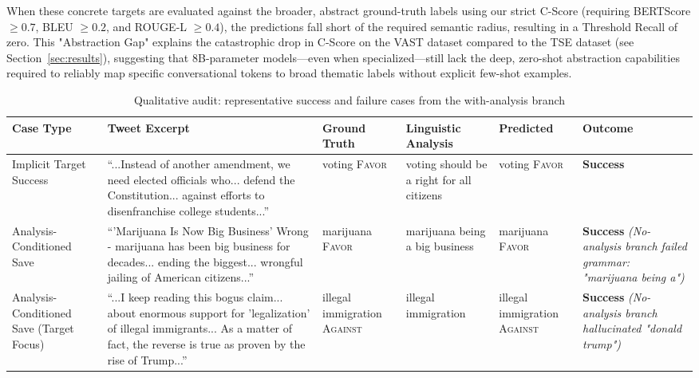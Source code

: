 \documentclass[conference]{IEEEtran}
\begin{document}
When these concrete targets are evaluated against the broader, abstract ground-truth labels using our strict C-Score (requiring BERTScore $\ge 0.7$, BLEU $\ge 0.2$, and ROUGE-L $\ge 0.4$), the predictions fall short of the required semantic radius, resulting in a Threshold Recall of zero. This "Abstraction Gap" explains the catastrophic drop in C-Score on the VAST dataset compared to the TSE dataset (see Section~\ref{sec:results}), suggesting that 8B-parameter models—even when specialized—still lack the deep, zero-shot abstraction capabilities required to reliably map specific conversational tokens to broad thematic labels without explicit few-shot examples.


\begin{table}[htbp]
\caption{Qualitative audit: representative success and failure cases from the with-analysis branch}
\label{tab:interpretability_audit}
\centering
\small
\begin{tabular}{|p{}|p{}|p{}|p{}|p{}|p{}|}
\hline
\textbf{Case Type} & \textbf{Tweet Excerpt} & \textbf{Ground Truth} & \textbf{Linguistic Analysis} & \textbf{Predicted} & \textbf{Outcome} \\
\hline
Implicit Target Success & ``...Instead of another amendment, we need elected officials who... defend the Constitution... against efforts to disenfranchise college students...'' & voting \newline \textsc{Favor} & voting should be a right for all citizens & voting \newline \textsc{Favor} & \textbf{Success} \\
\hline
Analysis-Conditioned Save & ``'Marijuana Is Now Big Business' Wrong - marijuana has been big business for decades... ending the biggest... wrongful jailing of American citizens...'' & marijuana \newline \textsc{Favor} & marijuana being a big business & marijuana \newline \textsc{Favor} & \textbf{Success} \newline \textit{(No-analysis branch failed grammar: "marijuana being a")} \\
\hline
Analysis-Conditioned Save (Target Focus) & ``...I keep reading this bogus claim... about enormous support for 'legalization' of illegal immigrants... As a matter of fact, the reverse is true as proven by the rise of Trump...'' & illegal immigration \newline \textsc{Against} & illegal immigration & illegal immigration \newline \textsc{Against} & \textbf{Success} \newline \textit{(No-analysis branch hallucinated "donald trump")} \\

\end{tabular}
\end{table}
\end{document}

